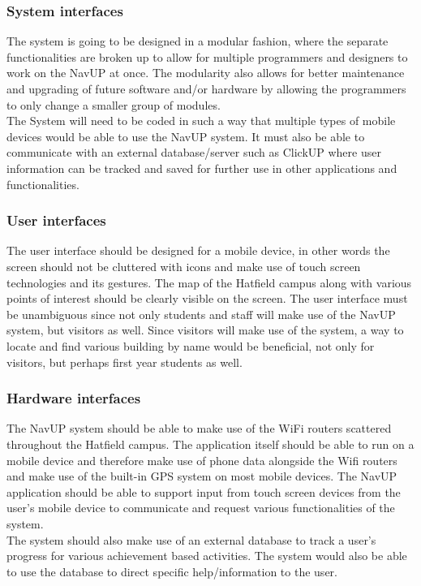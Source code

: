 \documentclass[a4paper,12pt]{article}
\begin{document}
\subsubsection{System interfaces}
The system is going to be designed in a modular fashion, where the separate functionalities are broken up to allow for multiple programmers and designers to work on the NavUP at once. The modularity also allows for better maintenance and upgrading of future software and/or hardware by allowing the programmers to only change a smaller group of modules.\\
The System will need to be coded in such a way that multiple types of mobile devices would be able to use the NavUP system. It must also be able to communicate with an external database/server such as ClickUP where user information can be tracked and saved for further use in other applications and functionalities.
\subsubsection{User interfaces}
The user interface should be designed for a mobile device, in other words the screen should not be cluttered with icons and make use of touch screen technologies and its gestures. The map of the Hatfield campus along with various points of interest should be clearly visible on the screen. The user interface must be unambiguous since not only students and staff will make use of the NavUP system, but visitors as well. Since visitors will make use of the system, a way to locate and find various building by name would be beneficial, not only for visitors, but perhaps first year students as well.
\subsubsection{Hardware interfaces}
The NavUP system should be able to make use of the WiFi routers scattered throughout the Hatfield campus. The application itself should be able to run on a mobile device and therefore make use of phone data alongside the Wifi routers and make use of the built-in GPS system on most mobile devices. The NavUP application should be able to support input from touch screen devices from the user’s mobile device to communicate and request various functionalities of the system.\\
The system should also make use of an external database to track a user’s progress for various achievement based activities. The system would also be able to use the database to direct specific help/information to the user.
\end{document}
